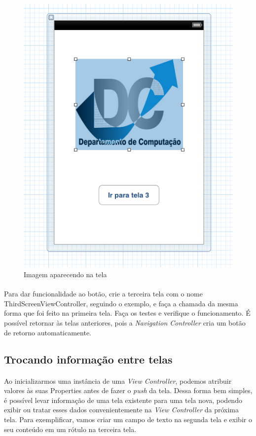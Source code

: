 \documentclass[a4paper,12pt,brazil,doubleside]{book}
\begin{document}
\begin{figure}[!h]
  \centering
  \includegraphics[totalheight=0.25\textheight]{figuras/2/xib2_tela2.png}
  \caption{Imagem aparecendo na tela}
  \label{fig:a}
\end{figure}

\paragraph{}Para dar funcionalidade ao botão, crie a terceira tela com o nome ThirdScreenViewController, seguindo o exemplo, e faça a chamada da mesma forma que foi feito na primeira tela. Faça os testes e verifique o funcionamento. É possível retornar às telas anteriores, pois a \emph{Navigation Controller} cria um botão de retorno automaticamente.

\bigskip

\subsection{Trocando informação entre telas}

\paragraph{}Ao inicializarmos uma instância de uma \emph{View Controller}, podemos atribuir valores às suas Properties antes de fazer o \emph{push} da tela. Dessa forma bem simples, é possível levar informação de uma tela existente para uma tela nova, podendo exibir ou tratar esses dados convenientemente na \emph{View Controller} da próxima tela. Para exemplificar, vamos criar um campo de texto na segunda tela e exibir o seu conteúdo em um rótulo na terceira tela.
\end{document}
